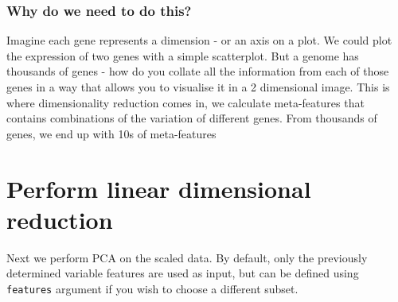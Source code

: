 \documentclass[
]{book}
\begin{document}
\subsubsection*{Why do we need to do this?}\label{why-do-we-need-to-do-this-4}

Imagine each gene represents a dimension - or an axis on a plot. We could plot the expression of two genes with a simple scatterplot. But a genome has thousands of genes - how do you collate all the information from each of those genes in a way that allows you to visualise it in a 2 dimensional image. This is where dimensionality reduction comes in, we calculate meta-features that contains combinations of the variation of different genes. From thousands of genes, we end up with 10s of meta-features

\subsubsection*{}\label{section-6}

\section{Perform linear dimensional reduction}\label{perform-linear-dimensional-reduction}

Next we perform PCA on the scaled data. By default, only the previously determined variable features are used as input, but can be defined using \texttt{features} argument if you wish to choose a different subset.
\end{document}
